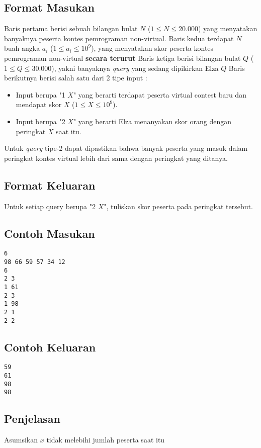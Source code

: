 \documentclass{article}
\begin{document}
\subsection*{Format Masukan}
Baris pertama berisi sebuah bilangan bulat $N$ ($1 \leq N \leq 20.000$) yang menyatakan banyaknya peserta kontes pemrograman non-virtual.
Baris kedua terdapat $N$ buah angka $a_i$ ($1 \leq a_i \leq 10^9$), yang menyatakan skor peserta kontes pemrograman non-virtual \textbf{secara terurut}
Baris ketiga berisi bilangan bulat $Q$ ($1 \leq Q \leq 30.000$), yakni banyaknya \textit{query} yang sedang dipikirkan Elza
$Q$ Baris berikutnya berisi salah satu dari 2 tipe input :
\begin{itemize}
    \setlength{\itemsep}{0pt}
    \item Input berupa "1 $X$" yang berarti terdapat peserta virtual contest baru dan mendapat skor $X$ ($1 \leq X \leq 10^9$).
    \item Input berupa "2 $X$" yang berarti Elza menanyakan skor orang dengan peringkat $X$ saat itu.
\end{itemize}
Untuk \textit{query} tipe-2 dapat dipastikan bahwa banyak peserta yang masuk dalam peringkat kontes virtual lebih
dari sama dengan peringkat yang ditanya.

\subsection*{Format Keluaran}

Untuk setiap query berupa "2 $X$", tuliskan skor peserta pada peringkat tersebut.
\\

\begin{multicols}{2}
\subsection*{Contoh Masukan}
\begin{lstlisting}
6
98 66 59 57 34 12
6
2 3
1 61
2 3
1 98
2 1
2 2
\end{lstlisting}
\columnbreak
\subsection*{Contoh Keluaran}
\begin{lstlisting}
59
61
98
98
\end{lstlisting}
\vfill
\null
\end{multicols}

\subsection*{Penjelasan}
Asumsikan $x$ tidak melebihi jumlah peserta saat itu

\pagebreak
\end{document}
